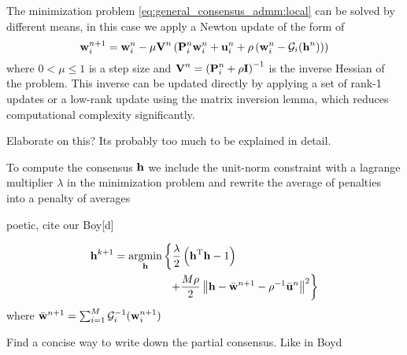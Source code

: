 \documentclass{article}
\newcommand{\h}{\mtxb{h}}
\newcommand{\w}{\mtxb{w}}
\newcommand{\uu}{\mtxb{u}}
\newcommand{\aRho}{\mtxb{P}}
\newcommand{\I}{\mtxb{I}}
\begin{document}
The minimization problem \eqref{eq:general_consensus_admm:local} can be solved by different means, in this case we apply a Newton update of the form of
\begin{equation}
    \w_i^{n+1} = \w_i^{n} - \mu \mtxb{V}^n \left( \aRho_i^n \w_i^n + \uu_i^n + \rho\left(\w_i^n - \mathcal{G}_i(\h^n)\right)\right)
\end{equation}
where \(0  <\mu\leq 1\) is a step size and \(\mtxb{V}^n = \left(\aRho_i^n + \rho \I \right)^{-1}\) is the inverse Hessian of the problem.
This inverse can be updated directly by applying a set of rank-1 updates or a low-rank update using the matrix inversion lemma, which reduces computational complexity significantly.
\begin{attention}
    Elaborate on this? Its probably too much to be explained in detail.
\end{attention}

To compute the consensus \(\h\) we include the unit-norm constraint with a lagrange multiplier \(\lambda\) in the minimization problem and rewrite the average of penalties into a penalty of averages \cite{}
\begin{attention}
    poetic, cite our Boy[d]
\end{attention}
\begin{align}
    \h^{k+1} &= \underset{\h}{\operatorname{argmin}} \left\{ \frac{\lambda}{2} \left(\h^\T \h - 1\right)\right.\nonumber\\
    &\left. \qquad \qquad \quad + \frac{M \rho}{2} \left\| \h - \bar{\w}^{n+1} - \rho^{-1} \bar{\uu}^{n} \right\|^2 \right\}
\end{align}
where \(\bar{\w}^{n+1} = \sum_{i=1}^{M} \mathcal{G}_i^{-1}(\w_i^{n+1})\)
\begin{attention}
    Find a concise way to write down the partial consensus. Like in Boyd
\end{attention}


\end{document}

